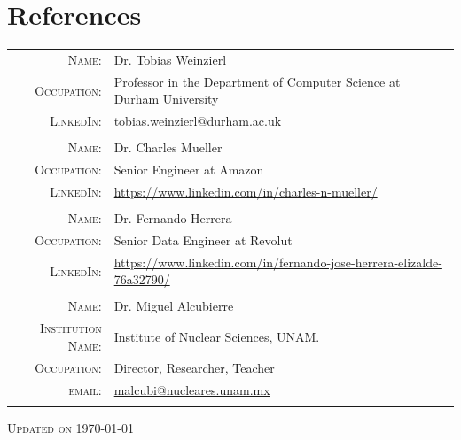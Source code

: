 \documentclass[a4paper,10pt]{article} %
\begin{document}
\section{References}
\bigskip
\begin{tabular}{rl}
	\textsc{Name:} & Dr. Tobias Weinzierl\\
	\textsc{Occupation:} & Professor in the Department of Computer Science at Durham University\\
	\textsc{LinkedIn:} & \href{tobias.weinzierl@durham.ac.uk }{tobias.weinzierl@durham.ac.uk }\\
	\multicolumn{2}{c}{} \\
	\textsc{Name:} & Dr. Charles Mueller\\
	\textsc{Occupation:} & Senior Engineer at Amazon\\
	\textsc{LinkedIn:} & \href{https://www.linkedin.com/in/charles-n-mueller/}{https://www.linkedin.com/in/charles-n-mueller/}\\
	\multicolumn{2}{c}{} \\
	\textsc{Name:} & Dr. Fernando Herrera \\
	\textsc{Occupation:} & Senior Data Engineer at Revolut\\
	\textsc{LinkedIn:} & \href{https://www.linkedin.com/in/fernando-jose-herrera-elizalde-76a32790/}{https://www.linkedin.com/in/fernando-jose-herrera-elizalde-76a32790/}\\
	\multicolumn{2}{c}{} \\
	\textsc{Name:} & Dr. Miguel Alcubierre \\
	\textsc{Institution Name:} & Institute of Nuclear Sciences, UNAM.\\
	\textsc{Occupation:} & Director, Researcher, Teacher\\
	\textsc{email:} & \href{mailto:malcubi@nucleares.unam.mx}{malcubi@nucleares.unam.mx}\\
	\multicolumn{2}{c}{} \\
\end{tabular}
\vspace{0cm}
\begin{center}
	\textsc{Updated on \today}
\end{center}


\newpage

\end{document}
